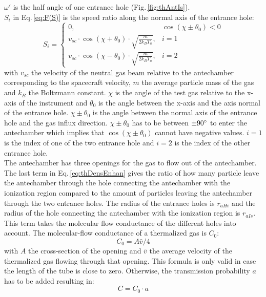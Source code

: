 		$\omega'$ is the half angle of one entrance hole (Fig.\,\ref{fig:thAntIs}).\\
		$S_i$ in Eq.\,\eqref{eq:F(S)} is the speed ratio along the normal axis of the entrance hole:
		\begin{equation}
			S_i = 
			\begin{cases}
				0, & \cos(\chi \pm \theta_0) < 0\\
				v_{sc}\cdot \cos(\chi + \theta_0)\cdot \sqrt{\frac{m}{2k_B T_a}}, & i=1\\
				v_{sc}\cdot \cos(\chi - \theta_0)\cdot \sqrt{\frac{m}{2k_B T_a}}, & i=2
			\end{cases}
		\end{equation}
		with $v_{sc}$ the velocity of the neutral gas beam relative to the antechamber corresponding to the spacecraft velocity, $m$ the average particle mass of the gas and $k_B$ the Boltzmann constant. $\chi$ is the angle of the test gas relative to the x-axis of the instrument and $\theta_0$ is the angle between the x-axis and the axis normal of the entrance hole. $\chi \pm \theta_0$ is the angle between the normal axis of the entrance hole and the gas influx direction. $\chi \pm \theta_0$ has to be between $\pm 90^\circ$ to enter the antechamber which implies that $\cos(\chi \pm \theta_0)$ cannot have negative values. $i=1$ is the index of one of the two entrance hole and $i=2$ is the index of the other entrance hole.\\ 
		The antechamber has three openings for the gas to flow out of the antechamber. The last term in Eq.\,\eqref{eq:thDensEnhan} gives the ratio of how many particle leave the antechamber through the hole connecting the antechamber with the ionization region compared to the amount of particles leaving the antechamber through the two entrance holes. The radius of the entrance holes is $r_{aHi}$ and the radius of the hole connecting the antechamber with the ionization region is $r_{aIs}$. This term takes the molecular flow conductance of the different holes into account. The molecular-flow conductance of a thermalized gas is $C_0$:
		\begin{equation}
			C_0 = A\bar{v}/4
			\label{eq:theoMolFlowCondC0}
		\end{equation}
		with $A$ the cross-section of the opening and $\bar{v}$ the average velocity of the thermalized gas flowing through that opening. This formula is only valid in case the length of the tube is close to zero. Otherwise, the transmission probability $a$ has to be added resulting in:
		\begin{equation}
			C = C_0 \cdot a
			\label{eq:theoMolFlowCondCEff}
		\end{equation}

